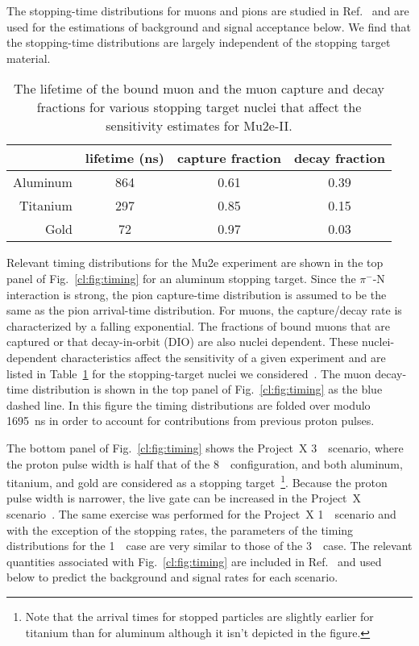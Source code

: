 The stopping-time distributions for muons and pions are studied in
Ref.~\cite{Mu2eII} and are used for the estimations of background and
signal acceptance below.  We find that the stopping-time distributions
are largely independent of the stopping target material.
   

\begin{table}[tb]
  \centering
  \begin{tabular}{rccc} \hline\hline
           & lifetime (ns) & capture fraction & decay fraction \\ \hline
  Aluminum & 864           & 0.61            & 0.39 \\
  Titanium & 297           & 0.85            & 0.15 \\ \hline\hline
  Gold     &  72           & 0.97            & 0.03     \\ \hline\hline
  \end{tabular}
  \caption{The lifetime of the bound muon and the muon capture and decay     
    fractions for various stopping target nuclei that affect the 
    sensitivity estimates for Mu2e-II. 
  }
  \label{cl:tab:nucleistuff}
\end{table}
  
Relevant timing distributions for the Mu2e experiment are shown in the
top panel of Fig.~\ref{cl:fig:timing} for an aluminum stopping
target. Since the $\pi^-$-N interaction is strong, the pion
capture-time distribution is assumed to be the same as the pion
arrival-time distribution.  For muons, the capture/decay rate is
characterized by a falling exponential.  The fractions of bound muons
that are captured or that decay-in-orbit (DIO) are also nuclei
dependent.  These nuclei-dependent characteristics affect the
sensitivity of a given experiment and are listed in
Table~\ref{cl:tab:nucleistuff} for the stopping-target nuclei we
considered~\cite{Suzuki:1987jf}.  The muon decay-time distribution is
shown in the top panel of Fig.~\ref{cl:fig:timing} as the blue dashed
line.  In this figure the timing distributions are folded over modulo
1695~ns in order to account for contributions from previous proton
pulses.

The bottom panel of Fig.~\ref{cl:fig:timing} shows the Project~X
3~\gev\ scenario, where the proton pulse width is half that of the
8~\gev\ configuration, and both aluminum, titanium, and gold are
considered as a stopping target~\footnote{Note that the arrival times
for stopped particles are slightly earlier for titanium than for
aluminum although it isn't depicted in the figure.}. Because the proton
pulse width is narrower, the live gate can be increased in the
Project~X scenario~\cite{MoveLiveGate}.  The same exercise was
performed for the Project~X 1~\gev\ scenario and with the exception of
the stopping rates, the parameters of the timing distributions for the
1~\gev\ case are very similar to those of the 3~\gev\ case.  The
relevant quantities associated with Fig.~\ref{cl:fig:timing} are
included in Ref.~\cite{Mu2eII} and used below to predict the
background and signal rates for each scenario.


